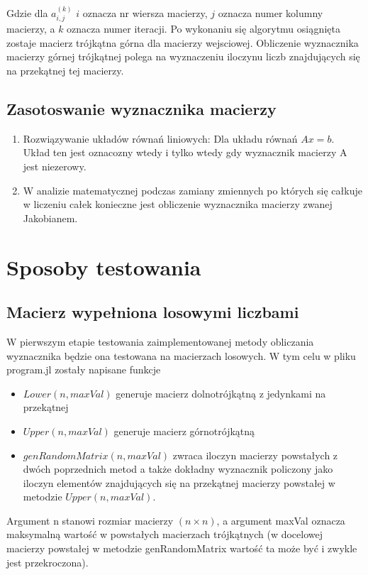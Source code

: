 \documentclass{article}
\begin{document}
Gdzie dla $a_{i,j}^{(k)}$ $i$ oznacza nr wiersza macierzy, $j$ oznacza numer kolumny macierzy, a $k$ oznacza numer iteracji. Po wykonaniu się algorytmu osiągnięta zostaje macierz trójkątna górna dla macierzy wejsciowej. Obliczenie wyznacznika macierzy górnej trójkątnej polega na wyznaczeniu iloczynu liczb znajdujących się na przekątnej tej macierzy.
\subsection{Zasotoswanie wyznacznika macierzy}
\begin{enumerate}
\item Rozwiązywanie układów równań liniowych:
Dla układu równań $Ax=b$.
Układ ten jest oznacozny wtedy i tylko wtedy gdy wyznacznik macierzy A jest niezerowy.
\item W analizie matematycznej podczas zamiany zmiennych po których się całkuje w liczeniu całek  konieczne jest obliczenie wyznacznika macierzy zwanej Jakobianem.
\end{enumerate}



\newpage
\section{Sposoby testowania}
\subsection{Macierz wypełniona losowymi liczbami}
W pierwszym etapie testowania zaimplementowanej metody obliczania wyznacznika będzie ona testowana na macierzach losowych. W tym celu w pliku program.jl zostały napisane funkcje
\begin{itemize}
    \item $Lower(n,maxVal)$ generuje macierz dolnotrójkątną z jedynkami na przekątnej
    \item $Upper(n, maxVal)$ generuje macierz górnotrójkątną
    \item $genRandomMatrix(n, maxVal)$ zwraca iloczyn macierzy powstałych z dwóch poprzednich metod a także dokładny wyznacznik policzony jako iloczyn elementów znajdujących się na przekątnej macierzy powstałej w metodzie $Upper(n, maxVal)$.
\end{itemize}

Argument n stanowi rozmiar macierzy $(n \times n)$, a argument maxVal oznacza maksymalną wartość w powstałych macierzach trójkątnych (w docelowej macierzy powstałej w metodzie genRandomMatrix wartość ta może być i zwykle jest przekroczona).
\end{document}
